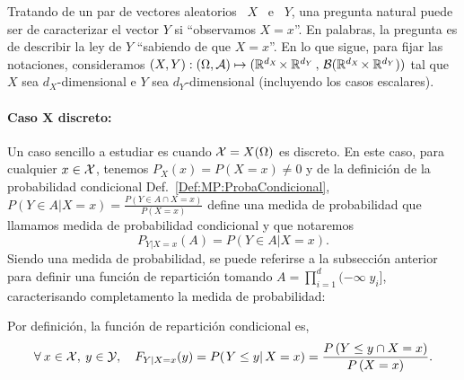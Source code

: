 \label{Sec:MP:LeyesCondicionales}

Tratando de un par de vectores aleatorios  \ $X$ \ e \ $Y$, una pregunta natural
puede ser de caracterizar el vector  $Y$ si ``observamos $X = x$''. En palabras,
la pregunta es de describir la ley de $Y$ ``sabiendo de que $X = x$''. En lo que
sigue, para  fijar las notaciones, consideramos  $(X,Y): ( \Omega  , \mathcal{A}) \mapsto
(\mathbb{R}^{d_X} \! \times \mathbb{R}^{d_Y} \, , \, \mathcal{B}(\mathbb{R}^{d_X} \! \times \mathbb{R}^{d_Y})
)$ tal que $X$ sea $d_X$-dimensional e $Y$ sea $d_Y$-dimensional (incluyendo los
casos escalares).



\paragraph{Caso $\boldsymbol{X}$ discreto:}
Un caso  sencillo a estudiar  es cuando $\mathcal{X}  = X(\Omega)$ es discreto.   En este
caso, para  cualquier $x  \in \mathcal{X}$, tenemos  $P_X(x) = P(X  = x)  \ne 0$ y  de la
definici\'on de  la probabilidad condicional Def.~\ref{Def:MP:ProbaCondicional},
$P(Y \in A | X = x) = \frac{P(Y \in A \cap X = x)}{P(X=x)}$ define una medida de
probabilidad que llamamos medida de probabilidad condicional y que notaremos
%
\[
P_{Y|X=x}(A) = P(Y \in A | X = x).
\]
%
Siendo una medida de probabilidad, se puede referirse a la subsecci\'on anterior
para  definir  una  funci\'on   de  repartici\'on  tomando  $\displaystyle  A  =
\prod_{i=1}^d (-\infty \;  y_i]$, caracterisando completamento la medida de
probabilidad:
%
\begin{definicion}
\label{Def:MP:ReparticionCondicionalDiscreta}
%
  Por definici\'on, la funci\'on de repartici\'on condicional es,
  \[
  \forall \:  x \in  \mathcal{X}, \: y  \in \mathcal{Y}, \quad  F_{Y|X=x}(y) =  P( \left. Y  \le y
  \right|  X =  x  ) =  \frac{P\left(Y  \le y  \cap X  =  x \right)}{P\left(X  =
      x\right)}.
  \]
\end{definicion}

